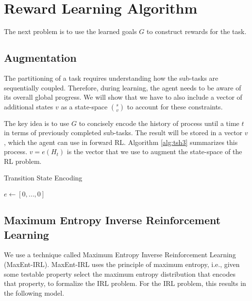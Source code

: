 \section{Reward Learning Algorithm}\label{sec:reward}
The next problem is to use the learned goals $G$ to construct rewards for the task.

\subsection{Augmentation}
The partitioning of a task requires understanding how the sub-tasks are sequentially coupled.
Therefore, during learning, the agent needs to be aware of its overall global progress.
We will show that we have to also include a vector of additional states $v$ as a state-space $\binom{s}{v}$ to account for these constraints.

The key idea is to use $G$ to concisely encode the history of process until a time $t$ in terms of previously completed sub-tasks. 
The result will be stored in a vector $v$, which the agent can use in forward RL.
Algorithm \ref{alg:tsh3} summarizes this process.
$v = e(H_t)$ is the vector that we use to augment the state-space of the RL problem.

\begin{algorithm}[t]
\small
\DontPrintSemicolon
\caption{Transition State Encoding \label{alg:tsh3}}

$e \leftarrow [0,...,0]$




\end{algorithm}


\subsection{Maximum Entropy Inverse Reinforcement Learning}
We use a technique called Maximum Entropy Inverse Reinforcement Learning (MaxEnt-IRL). 
MaxEnt-IRL uses the principle of maximum entropy, i.e., given some testable property select the maximum entropy distribution that encodes that property, to formalize the IRL problem.
For the IRL problem, this results in the following model.

